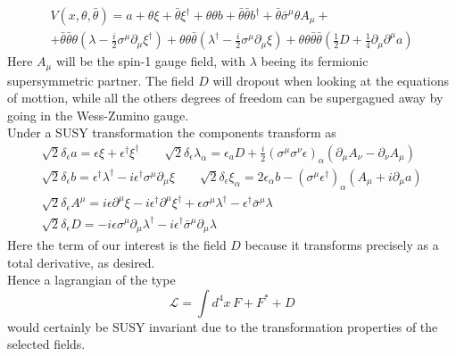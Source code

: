 \documentclass[12pt]{article}
\begin{document}
\begin{gather*}
  V\left(x, \theta, \bar\theta\right) = a+\theta \xi+\bar\theta \xi^{\dagger} +\theta \theta b+\bar\theta \bar\theta b^{\dagger}+\bar\theta \bar{\sigma}^{\mu} \theta A_{\mu}+ \\ 
                + \bar\theta \bar\theta \theta\left(\lambda-\frac{i}{2} \sigma^{\mu} \partial_{\mu} \xi^{\dagger}\right)
                +\theta \theta \bar\theta\left(\lambda^{\dagger}-\frac{i}{2} \sigma^{\mu} \partial_{\mu} \xi\right)+\theta \theta \bar\theta \bar\theta \left(\frac{1}{2} D+\frac{1}{4} \partial_{\mu} \partial^{\mu} a\right)
\end{gather*}
Here $A_\mu$ will be the spin-1 gauge field, with $\lambda$ beeing its fermionic supersymmetric partner. The field $D$ will dropout when looking at the equations of mottion, while all the others degrees of freedom can be supergagued away by going in the Wess-Zumino gauge. \\
Under a SUSY transformation the components transform as 
\begin{gather*}
  \sqrt{2} \delta_{\epsilon} a =\epsilon \xi+\epsilon^{\dagger} \xi^{\dagger} \qquad 
  \sqrt{2} \delta_{\epsilon} \lambda_{\alpha} =\epsilon_{a} D+\frac{i}{2}\left(\sigma^{\mu} \sigma^{\nu} \epsilon\right)_{\alpha}\left(\partial_{\mu} A_{\nu}-\partial_{\nu} A_{\mu}\right) \\
  \sqrt{2} \delta_{\epsilon} b =\epsilon^{\dagger} \lambda^{\dagger}-i \epsilon^{\dagger} \sigma^{\mu} \partial_{\mu} \xi \qquad
  \sqrt{2} \delta_{\epsilon} \xi_{\alpha} =2 \epsilon_{\alpha} b-\left(\sigma^{\mu} \epsilon^{\dagger}\right)_{\alpha}\left(A_{\mu}+i \partial_{\mu} a\right) \\
  \sqrt{2} \delta_{\epsilon} A^{\mu} =i \epsilon \partial^{\mu} \xi-i \epsilon^{\dagger} \partial^{\mu} \xi^{\dagger}+\epsilon \sigma^{\mu} \lambda^{\dagger}-\epsilon^{\dagger} \bar{\sigma}^{\mu} \lambda \\
  \boxed{\sqrt{2} \delta_{\epsilon} D =-i \epsilon \sigma^{\mu} \partial_{\mu} \lambda^{\dagger}-i \epsilon^{\dagger} \bar{\sigma}^{\mu} \partial_{\mu} \lambda}
\end{gather*}
Here the term of our interest is the field $D$ because it transforms precisely as a total derivative, as desired. \\
Hence a lagrangian of the type 
\begin{equation*}
  \mathcal{L} = \int d^4x \, F + F^* + D
\end{equation*}
would certainly be SUSY invariant due to the transformation properties of the selected fields. 
\end{document}
